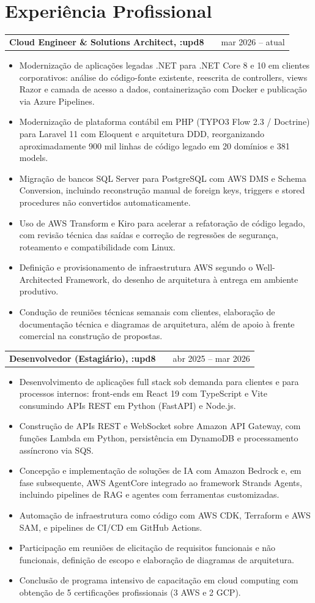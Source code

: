 \documentclass[a4paper,11pt]{article}
\makeatletter
\newenvironment{joblong}[2]
    {
    \begin{tabularx}{\linewidth}{@{}l X r@{}}
    \textbf{#1} & \hfill &  #2 \\[3.75pt]
    \end{tabularx}
    \begin{minipage}[t]{\linewidth}
    \begin{itemize}[nosep,after=\strut, leftmargin=1em, itemsep=3pt,label=--]
    }
    {
    \end{itemize}
    \end{minipage}
    }
\makeatother
\begin{document}
\section{Experiência Profissional}

\begin{joblong}{Cloud Engineer \& Solutions Architect, :upd8}{mar 2026 -- atual}
\item Modernização de aplicações legadas .NET para .NET Core 8 e 10 em clientes corporativos: análise do código-fonte existente, reescrita de controllers, views Razor e camada de acesso a dados, containerização com Docker e publicação via Azure Pipelines.
\item Modernização de plataforma contábil em PHP (TYPO3 Flow 2.3 / Doctrine) para Laravel 11 com Eloquent e arquitetura DDD, reorganizando aproximadamente 900 mil linhas de código legado em 20 domínios e 381 models.
\item Migração de bancos SQL Server para PostgreSQL com AWS DMS e Schema Conversion, incluindo reconstrução manual de foreign keys, triggers e stored procedures não convertidos automaticamente.
\item Uso de AWS Transform e Kiro para acelerar a refatoração de código legado, com revisão técnica das saídas e correção de regressões de segurança, roteamento e compatibilidade com Linux.
\item Definição e provisionamento de infraestrutura AWS segundo o Well-Architected Framework, do desenho de arquitetura à entrega em ambiente produtivo.
\item Condução de reuniões técnicas semanais com clientes, elaboração de documentação técnica e diagramas de arquitetura, além de apoio à frente comercial na construção de propostas.
\end{joblong}

\begin{joblong}{Desenvolvedor (Estagiário), :upd8}{abr 2025 -- mar 2026}
\item Desenvolvimento de aplicações full stack sob demanda para clientes e para processos internos: front-ends em React 19 com TypeScript e Vite consumindo APIs REST em Python (FastAPI) e Node.js.
\item Construção de APIs REST e WebSocket sobre Amazon API Gateway, com funções Lambda em Python, persistência em DynamoDB e processamento assíncrono via SQS.
\item Concepção e implementação de soluções de IA com Amazon Bedrock e, em fase subsequente, AWS AgentCore integrado ao framework Strands Agents, incluindo pipelines de RAG e agentes com ferramentas customizadas.
\item Automação de infraestrutura como código com AWS CDK, Terraform e AWS SAM, e pipelines de CI/CD em GitHub Actions.
\item Participação em reuniões de elicitação de requisitos funcionais e não funcionais, definição de escopo e elaboração de diagramas de arquitetura.
\item Conclusão de programa intensivo de capacitação em cloud computing com obtenção de 5 certificações profissionais (3 AWS e 2 GCP).
\end{joblong}
\end{document}

